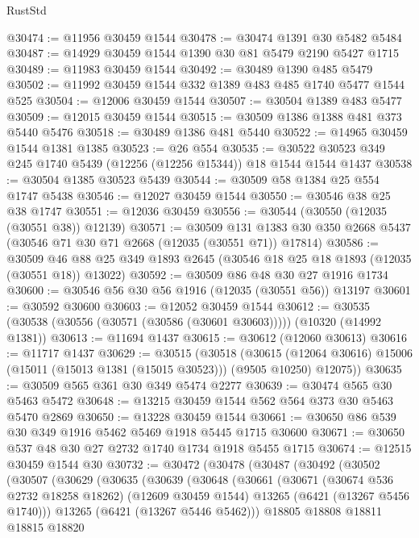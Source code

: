 \begin{lexlean}{RustStd}
\begin{coremodule}
@30474 := @11956 @30459 @1544
@30478 := @30474 @1391 @30 @5482 @5484
@30487 := @14929 @30459 @1544 @1390 @30 @81 @5479 @2190 @5427 @1715
@30489 := @11983 @30459 @1544
@30492 := @30489 @1390 @485 @5479
@30502 := @11992 @30459 @1544 @332 @1389 @483 @485 @1740 @5477 @1544 @525
@30504 := @12006 @30459 @1544
@30507 := @30504 @1389 @483 @5477
@30509 := @12015 @30459 @1544
@30515 := @30509 @1386 @1388 @481 @373 @5440 @5476
@30518 := @30489 @1386 @481 @5440
@30522 := @14965 @30459 @1544 @1381 @1385
@30523 := @26 @554
@30535 := @30522 @30523 @349 @245 @1740 @5439 (@12256 (@12256 @15344)) @18 @1544 @1544 @1437
@30538 := @30504 @1385 @30523 @5439
@30544 := @30509 @58 @1384 @25 @554 @1747 @5438
@30546 := @12027 @30459 @1544
@30550 := @30546 @38 @25 @38 @1747
@30551 := @12036 @30459
@30556 := @30544 (@30550 (@12035 (@30551 @38)) @12139)
@30571 := @30509
    @131
    @1383
    @30
    @350
    @2668
    @5437
    (@30546 @71 @30 @71 @2668 (@12035 (@30551 @71)) @17814)
@30586 := @30509
    @46
    @88
    @25
    @349
    @1893
    @2645
    (@30546 @18 @25 @18 @1893 (@12035 (@30551 @18)) @13022)
@30592 := @30509 @86 @48 @30 @27 @1916 @1734
@30600 := @30546 @56 @30 @56 @1916 (@12035 (@30551 @56)) @13197
@30601 := @30592 @30600
@30603 := @12052 @30459 @1544
@30612 := @30535 (@30538 (@30556 (@30571 (@30586 (@30601 @30603))))) (@10320 (@14992 @1381))
@30613 := @11694 @1437
@30615 := @30612 (@12060 @30613)
@30616 := @11717 @1437
@30629 := @30515
    (@30518
      (@30615 (@12064 @30616) @15006 (@15011 (@15013 @1381 (@15015 @30523))) (@9505 @10250) @12075))
@30635 := @30509 @565 @361 @30 @349 @5474 @2277
@30639 := @30474 @565 @30 @5463 @5472
@30648 := @13215 @30459 @1544 @562 @564 @373 @30 @5463 @5470 @2869
@30650 := @13228 @30459 @1544
@30661 := @30650 @86 @539 @30 @349 @1916 @5462 @5469 @1918 @5445 @1715 @30600
@30671 := @30650 @537 @48 @30 @27 @2732 @1740 @1734 @1918 @5455 @1715
@30674 := @12515 @30459 @1544 @30
@30732 := @30472
    (@30478
      (@30487
        (@30492
          (@30502
            (@30507
              (@30629
                (@30635
                  (@30639
                    (@30648
                      (@30661
                        (@30671
                          (@30674 @536 @2732 @18258 @18262)
                          (@12609 @30459 @1544)
                          @13265
                          (@6421 (@13267 @5456 @1740)))
                        @13265
                        (@6421 (@13267 @5446 @5462)))
                      @18805
                      @18808
                      @18811
                      @18815
                      @18820

\end{coremodule}
\end{lexlean}
